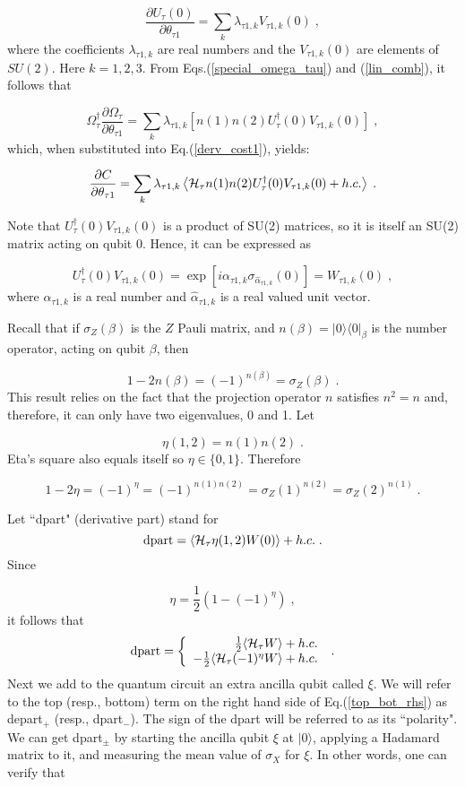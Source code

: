 \documentclass[12pt]{article}
\newcommand{\bra}[1]{\langle#1|}
\newcommand{\ket}[1]{|#1\rangle}
\newcommand{\beq}{\begin{equation}}
\newcommand{\eeq}{\end{equation}}
\newcommand{\hh}{{\cal H}}
\begin{document}
{\beq
\frac{\partial U_{\tau}(0)}{\partial\theta_{\tau 1}}
=
\sum_k \lambda_{\tau 1,k} V_{\tau 1,k}(0)
\;,
\label{lin_comb}
\eeq
where the
coefficients $\lambda_{\tau 1,k}$
are real numbers and the
$V_{\tau 1,k}(0)$ are elements of $SU(2)$.
Here
$k=1,2,3$.
From Eqs.(\ref{special_omega_tau})
and (\ref{lin_comb}), it follows that

\beq
\Omega^\dagger_\tau
\frac{\partial \Omega_\tau}{\partial\theta_{\tau 1}}
=
\sum_k \lambda_{\tau 1,k}\left[
n(1)n(2)U^\dagger_{\tau}(0)V_{\tau 1,k}(0)
\right]
\;,
\eeq
which, when substituted into Eq.(\ref{derv_cost1}),
yields:

\beq
\frac{\partial C}{\partial\theta_{\tau 1}}
=
\sum_k \lambda_{\tau 1,k}
\left\langle
\hh_\tau n(1)n(2)U^\dagger_{\tau}(0)V_{\tau 1,k}(0)
+h.c.\right\rangle
\;.
\eeq

Note that
$U^\dagger_{\tau}(0)V_{\tau 1,k}(0)$ is
a product of SU(2) matrices, so
it is itself an SU(2)
matrix acting on qubit 0.
Hence, it can be expressed as

\beq
U^\dagger_{\tau}(0)V_{\tau 1,k}(0)
= \exp[i\alpha_{\tau 1,k} \sigma_{\hat{\alpha}_{\tau 1,k}}(0)]=
W_{\tau 1,k}(0)
\;,
\eeq
where $\alpha_{\tau 1,k}$ is a real number
and $\hat{\alpha}_{\tau 1,k}$ is a real
valued unit vector.

Recall that if $\sigma_Z(\beta)$ is the $Z$ Pauli matrix,
and $n(\beta)=\ket{0}\bra{0}_\beta$ is the number operator,
acting on qubit $\beta$,
then

\beq
1-2n(\beta) = (-1)^{n(\beta)} = \sigma_Z(\beta)
\;.
\eeq
This result relies on the fact
that the projection operator $n$
satisfies $n^2=n$  and, therefore, it
can only have two eigenvalues, 0 and 1.
Let

\beq
\eta(1, 2) = n(1)n(2)
\;.
\eeq
Eta's square also equals itself so
$\eta\in \{0, 1\}$. Therefore

\beq
1-2\eta = (-1)^{\eta} = (-1)^{n(1)n(2)} = \sigma_Z(1)^{n(2)}=
\sigma_Z(2)^{n(1)}
\;.
\eeq

Let ``dpart" (derivative part) stand for
\beq
{\rm dpart} =\langle \hh_\tau  \eta(1,2)W(0)\rangle + h.c.
\;.
\eeq
Since

\beq
\eta= \frac{1}{2}(1- (-1)^\eta)
\;,
\eeq
it follows that
\beq
{\rm dpart}
=
\left\{\begin{array}{r}
\frac{1}{2}\langle \hh_\tau  W\rangle + h.c.
\\
-\frac{1}{2}\langle \hh_\tau  (-1)^\eta W\rangle + h.c.
\end{array}\right.
\;.
\label{top_bot_rhs}
\eeq
Next we add to the quantum circuit
an extra ancilla qubit called $\xi$.
We will refer to the top (resp., bottom)
term on the right hand side of Eq.(\ref{top_bot_rhs})
as depart$_+$ (resp., dpart$_-$). The sign
of the dpart
will be referred to as its ``polarity". We can get
dpart$_\pm$ by
starting the ancilla qubit $\xi$
at $\ket{0}$,
applying a Hadamard
matrix to it,
and measuring the mean value
of $\sigma_X$ for $\xi$.
In other words, one can verify that

}
\end{document}
